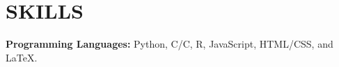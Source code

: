 \documentclass[letterpaper, 9pt]{extarticle}
\newcommand{\CPP}{C\nolinebreak\hspace{-.05em}\raisebox{.4ex}{\tiny\bf +}\nolinebreak\hspace{-.10em}\raisebox{.4ex}{\tiny\bf +}}
\begin{document}


   

\section*{SKILLS}
\textbf{Programming Languages:} Python, C/\CPP\@, R, JavaScript, HTML/CSS, and \LaTeX.

\end{document}
